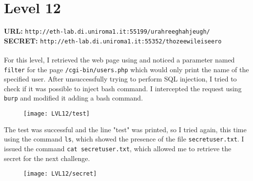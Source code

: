 \documentclass[12pt,a4paper]{article}
\begin{document}
	\section*{Level 12}
	\textbf{URL: }\texttt{http://eth-lab.di.uniroma1.it:55199/urahreeghahjeugh/}\\
	\textbf{SECRET: }\texttt{http://eth-lab.di.uniroma1.it:55352/thozeewileiseero}\\\\
	For this level, I retrieved the web page using  and noticed a parameter named \texttt{filter} for the page \texttt{/cgi-bin/users.php} which would only print the name of the specified user. After unsuccessfully trying to perform SQL injection, I tried to check if it was possible to inject bash command. I intercepted the request using \texttt{burp} and modified it adding a bash command.
	\begin{figure}[H]
		\centering
		\texttt{[image: LVL12/test]}
		\label{fig:test12}
	\end{figure}
 	The test was successful and the line "test" was printed, so I tried again, this time using the command \texttt{ls}, which showed the presence of the file \texttt{secretuser.txt}. I issued the command \texttt{cat secretuser.txt}, which allowed me to retrieve the secret for the next challenge.
	\begin{figure}[H]
		\centering
		\texttt{[image: LVL12/secret]}
		\label{fig:secret12}
	\end{figure}

\end{document}
